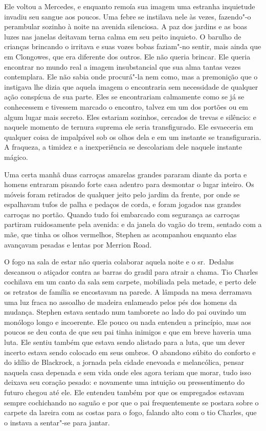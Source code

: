 Ele voltou a Mercedes, e enquanto remoía sua imagem uma estranha
inquietude invadiu seu sangue aos poucos. Uma febre se instilava nele
às vezes, fazendo"-o perambular sozinho à noite na avenida silenciosa. A
paz dos jardins e as boas luzes nas janelas deitavam terna calma em seu
peito inquieto. O barulho de crianças brincando o irritava e suas vozes
bobas faziam"-no sentir, mais ainda que em Clongowes, que era diferente
dos outros. Ele não queria brincar. Ele queria encontrar no mundo real
a imagem insubstancial que sua alma tantas vezes contemplara. Ele não
sabia onde procurá"-la nem como, mas a premonição que o instigava lhe
dizia que aquela imagem o encontraria sem necessidade de qualquer ação
conspícua de sua parte. Eles se encontrariam calmamente como se já se 
conhecessem e tivessem marcado o encontro, talvez em um dos portões ou
em algum lugar mais secreto. Eles estariam sozinhos, cercados de trevas
e silêncio: e naquele momento de ternura suprema ele seria
transfigurado. Ele esvaeceria em qualquer coisa de impalpável sob os
olhos dela e em um instante se transfiguraria. A fraqueza, a timidez e
a inexperiência se descolariam dele naquele instante mágico.

\asterisc

Uma certa manhã duas carroças amarelas grandes pararam diante da porta e
homens entraram pisando forte casa adentro para desmontar o lugar
inteiro. Os móveis foram retirados de qualquer jeito pelo jardim da
frente, por onde se espalhavam tufos de palha e pedaços de corda, e
foram jogados nas grandes carroças no portão. Quando tudo foi embarcado
com segurança as carroças partiram ruidosamente pela avenida: e da
janela do vagão do trem, sentado com a mãe, que tinha os olhos
vermelhos, Stephen as acompanhou enquanto elas avançavam pesadas e
lentas por Merrion Road.

O fogo na sala de estar não queria colaborar aquela noite e o sr.~Dedalus 
descansou o atiçador contra as barras do gradil para atrair a
chama. Tio Charles cochilava em um canto da sala sem carpete,
mobiliada pela metade, e perto dele os retratos de família se
encostavam na parede. A lâmpada na mesa derramava uma luz fraca no
assoalho de madeira enlameado pelos pés dos homens da mudança. Stephen
estava sentado num tamborete ao lado do pai ouvindo um monólogo longo e
incoerente. Ele pouco ou nada entendeu a princípio, mas aos poucos se
deu conta de que seu pai tinha inimigos e que em breve haveria uma
luta. Ele sentiu também que estava sendo alistado para a luta, que um
dever incerto estava sendo colocado em seus ombros. O abandono súbito
do conforto e do idílio de Blackrock, a jornada pela cidade enevoada e
melancólica, pensar naquela casa depenada e sem vida onde eles agora
teriam que morar, tudo isso deixava seu coração pesado: e novamente uma
intuição ou pressentimento do futuro chegou até ele. Ele entendeu
também por que os empregados estavam sempre cochichando no saguão e por que
o pai frequentemente se postara sobre o carpete da lareira com as
costas para o fogo, falando alto com o tio Charles, que o instava a
sentar"-se para jantar.

